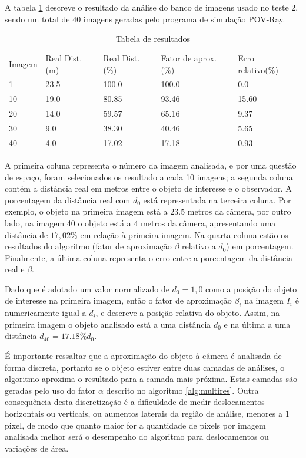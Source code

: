A tabela \ref{tab:tab1} descreve o resultado da análise do banco 
de imagens usado no teste 2, sendo um total de 40 imagens geradas
pelo programa de simulação POV-Ray.
\begin{table}[H]
\setlength{\tabcolsep}{1 pt} 
\caption{Tabela de resultados}
\begin{tabular}{lllll}
Imagem & Real Dist.(m) & Real Dist.(\%) & Fator de aprox.(\%) & Erro relativo(\%)\\
1 & 23.5 & 100.0 & 100.0 & 0.0 \\
10 & 19.0 & 80.85 & 93.46 & 15.60 \\
20 & 14.0 & 59.57 & 65.16 & 9.37 \\
30 & 9.0 & 38.30 & 40.46 & 5.65 \\
40 & 4.0 & 17.02 & 17.18 & 0.93
\end{tabular}
\label{tab:tab1}
\end{table}
A primeira coluna representa o número da imagem analisada, e por uma questão de espaço, foram selecionados 
os resultado a cada 10 imagens; a segunda coluna contém a distância 
real em metros entre o objeto de interesse e o observador.
A porcentagem da distância real com $d_0$ está representada na terceira coluna. Por exemplo, o objeto na primeira imagem
está a $23.5$ metros da câmera, por outro lado, na imagem 40 o objeto está a
$4$ metros da câmera, apresentando uma distância de  $17,02$\% em relação à primeira imagem. Na quarta coluna estão os resultados do algoritmo (fator
de aproximação $\beta$ relativo a $d_0$) em porcentagem. Finalmente, a última coluna representa o erro 
entre a porcentagem da distância real e $\beta$.

Dado que é adotado um valor normalizado de $d_0=1,0$ como a posição do objeto de interesse na primeira 
imagem, então o fator de aproximação $\beta_i$ na imagem $I_i$ é 
numericamente igual a $d_i$, e descreve a posição relativa do objeto.
Assim, na primeira imagem o objeto analisado está a uma distância $d_0$
e na última a uma distância $d_{40}=17.18\%d_0$.

É importante ressaltar que a aproximação do objeto à câmera é analisada de forma discreta, 
portanto se o objeto
estiver entre duas camadas de análises, o algoritmo aproxima o resultado para
a camada mais próxima. Estas camadas são geradas pelo uso do fator $\alpha$
descrito no algoritmo \ref{alg:multires}. Outra consequência desta discretização
é a dificuldade de medir deslocamentos horizontais ou verticais, ou aumentos laterais da região de análise,
menores a $1$ pixel, de modo que quanto maior for a quantidade de pixels por
imagem analisada melhor será o desempenho do algoritmo para deslocamentos ou variações de área.

